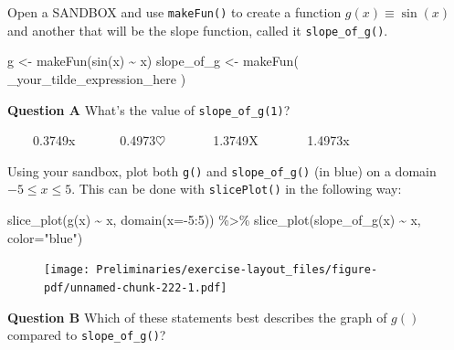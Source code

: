 \documentclass[
  letterpaper,
  DIV=11,
  numbers=noendperiod,
  oneside]{article}
\newenvironment{Shaded}{\begin{snugshade}}{\end{snugshade}}
\newcommand{\AttributeTok}[1]{\textcolor[rgb]{0.40,0.45,0.13}{#1}}
\newcommand{\DecValTok}[1]{\textcolor[rgb]{0.68,0.00,0.00}{#1}}
\newcommand{\FunctionTok}[1]{\textcolor[rgb]{0.28,0.35,0.67}{#1}}
\newcommand{\NormalTok}[1]{\textcolor[rgb]{0.00,0.23,0.31}{#1}}
\newcommand{\OtherTok}[1]{\textcolor[rgb]{0.00,0.23,0.31}{#1}}
\newcommand{\SpecialCharTok}[1]{\textcolor[rgb]{0.37,0.37,0.37}{#1}}
\newcommand{\StringTok}[1]{\textcolor[rgb]{0.13,0.47,0.30}{#1}}
\begin{document}
\begin{multicols}{2}
Open a SANDBOX and use \texttt{makeFun()} to create a function
\(g(x) \equiv \sin(x)\) and another that will be the slope function,
called it \texttt{slope\_of\_g()}.

\begin{Shaded}
\begin{Highlighting}[]
\NormalTok{g }\OtherTok{\textless{}{-}} \FunctionTok{makeFun}\NormalTok{(}\FunctionTok{sin}\NormalTok{(x) }\SpecialCharTok{\textasciitilde{}}\NormalTok{ x)}
\NormalTok{slope\_of\_g }\OtherTok{\textless{}{-}} \FunctionTok{makeFun}\NormalTok{( \_your\_tilde\_expression\_here )}
\end{Highlighting}
\end{Shaded}

\textbf{Question A} What's the value of \texttt{slope\_of\_g(1)}?

~~~~{0.3749{x}}~~~~~~~{0.4973{\(\heartsuit\ \)}}~~~~~~~{1.3749{︎X
}}~~~~~~~{1.4973{x}}

Using your sandbox, plot both \texttt{g()} and \texttt{slope\_of\_g()}
(in blue) on a domain \(-5 \leq x \leq 5\). This can be done with
\texttt{slicePlot()} in the following way:

\begin{Shaded}
\begin{Highlighting}[]
\FunctionTok{slice\_plot}\NormalTok{(}\FunctionTok{g}\NormalTok{(x) }\SpecialCharTok{\textasciitilde{}}\NormalTok{ x, }\FunctionTok{domain}\NormalTok{(}\AttributeTok{x=}\SpecialCharTok{{-}}\DecValTok{5}\SpecialCharTok{:}\DecValTok{5}\NormalTok{)) }\SpecialCharTok{\%\textgreater{}\%}
  \FunctionTok{slice\_plot}\NormalTok{(}\FunctionTok{slope\_of\_g}\NormalTok{(x) }\SpecialCharTok{\textasciitilde{}}\NormalTok{ x, }\AttributeTok{color=}\StringTok{"blue"}\NormalTok{)}
\end{Highlighting}
\end{Shaded}

\begin{figure}[H]

{\centering \texttt{[image: Preliminaries/exercise-layout\_files/figure-pdf/unnamed-chunk-222-1.pdf]}

}

\end{figure}

\textbf{Question B} Which of these statements best describes the graph
of \(g()\) compared to \texttt{slope\_of\_g()}?


\end{multicols}
\end{document}

